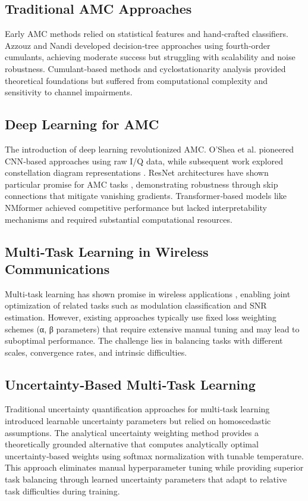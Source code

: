 \documentclass{ELSP}
\begin{document}
\subsection{Traditional AMC Approaches}
Early AMC methods relied on statistical features and hand‑crafted classifiers. Azzouz and Nandi \cite{azzouz1995algorithms} developed decision‑tree approaches using fourth‑order cumulants, achieving moderate success but struggling with scalability and noise robustness. Cumulant‑based methods \cite{swami1998hierarchical} and cyclostationarity analysis \cite{gardner1991exploitation} provided theoretical foundations but suffered from computational complexity and sensitivity to channel impairments.

\subsection{Deep Learning for AMC}
The introduction of deep learning revolutionized AMC. O'Shea et al. \cite{oshea2016radio} pioneered CNN‑based approaches using raw I/Q data, while subsequent work explored constellation diagram representations \cite{peng2021survey}. ResNet architectures have shown particular promise for AMC tasks \cite{kumar2023automatic}, demonstrating robustness through skip connections that mitigate vanishing gradients. Transformer‑based models like NMformer \cite{kong2023nmformer} achieved competitive performance but lacked interpretability mechanisms and required substantial computational resources.

\subsection{Multi‑Task Learning in Wireless Communications}
Multi‑task learning has shown promise in wireless applications \cite{jagannath2022multi}, enabling joint optimization of related tasks such as modulation classification and SNR estimation. However, existing approaches typically use fixed loss weighting schemes (α, β parameters) that require extensive manual tuning and may lead to suboptimal performance. The challenge lies in balancing tasks with different scales, convergence rates, and intrinsic difficulties.

\subsection{Uncertainty‑Based Multi‑Task Learning}
Traditional uncertainty quantification approaches for multi‑task learning \cite{kendall2018multi} introduced learnable uncertainty parameters but relied on homoscedastic assumptions. The analytical uncertainty weighting method \cite{liu2024analytical} provides a theoretically grounded alternative that computes analytically optimal uncertainty‑based weights using softmax normalization with tunable temperature. This approach eliminates manual hyperparameter tuning while providing superior task balancing through learned uncertainty parameters that adapt to relative task difficulties during training.
\end{document}
